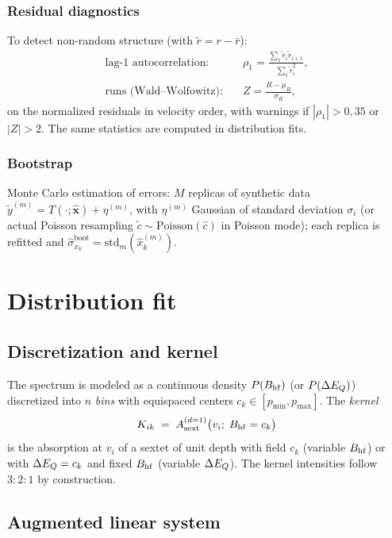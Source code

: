 \subsubsection{Residual diagnostics}
To detect non-random structure (with $\tilde r=r-\bar r$):
\begin{align}
  \text{lag-1 autocorrelation:}\quad &\rho_1=\frac{\sum_i\tilde r_i\tilde r_{i+1}}{\sum_i\tilde r_i^2},\\
  \text{runs (Wald–Wolfowitz):}\quad &Z=\frac{R-\mu_R}{\sigma_R},
\end{align}
on the normalized residuals in velocity order, with warnings if $|\rho_1|>0{,}35$ or
$|Z|>2$. The same statistics are computed in distribution fits.

\subsubsection{Bootstrap}
Monte Carlo estimation of errors: $M$ replicas of synthetic data
$\tilde y^{(m)}=T(\cdot;\hat{\bm x})+\eta^{(m)}$, with $\eta^{(m)}$ Gaussian of
standard deviation $\sigma_i$ (or actual Poisson resampling
$\tilde c\sim\mathrm{Poisson}(\hat c)$ in Poisson mode); each replica is refitted
and $\hat\sigma_{x_k}^{\text{boot}}=\mathrm{std}_m(\hat x_k^{(m)})$.

\section{Distribution fit}

\subsection{Discretization and kernel}\label{sec:dist-kernel}

The spectrum is modeled as a continuous density $P(B_{\mathrm{hf}})$ (or $P(\Delta E_{Q})$)
discretized into $n$ \emph{bins} with equispaced centers
$c_k\in[p_{\min},p_{\max}]$. The \emph{kernel}
\begin{equation}
  K_{ik} \;=\; A_{\text{sext}}^{(d=1)}\bigl(v_i;\;B_{\mathrm{hf}}=c_k\bigr)
\end{equation}
is the absorption at $v_i$ of a sextet of unit depth with field $c_k$ (variable
$B_{\mathrm{hf}}$) or with $\Delta E_{Q}=c_k$ and fixed $B_{\mathrm{hf}}$ (variable $\Delta E_{Q}$). The kernel
intensities follow $3{:}2{:}1$ by construction.

\subsection{Augmented linear system}\label{sec:dist-system}

